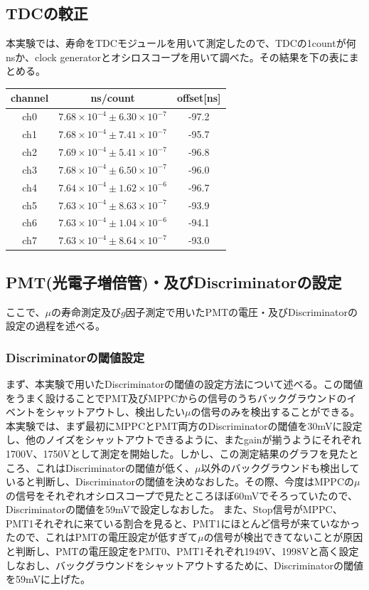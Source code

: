 \subsection{TDCの較正}
本実験では、寿命をTDCモジュールを用いて測定したので、TDCの1countが何nsか、clock generatorとオシロスコープを用いて調べた。その結果を下の表にまとめる。
\begin{table}[H]
  \begin{center}
    \begin{tabular}{c|c|c} \hline
      channel & ns/count & offset[ns] \\ \hline
      ch0 &  $7.68\times 10^{-4}\pm 6.30\times 10^{-7}$ & -97.2 \\
      ch1 &  $7.68\times 10^{-4}\pm 7.41\times 10^{-7}$ & -95.7 \\
      ch2 &  $7.69\times 10^{-4}\pm 5.41\times 10^{-7}$ & -96.8 \\
      ch3 &  $7.68\times 10^{-4}\pm 6.50\times 10^{-7}$ & -96.0 \\
      ch4 &  $7.64\times 10^{-4}\pm 1.62\times 10^{-6}$ & -96.7 \\
      ch5 &  $7.63\times 10^{-4}\pm 8.63\times 10^{-7}$ & -93.9 \\
      ch6 &  $7.63\times 10^{-4}\pm 1.04\times 10^{-6}$ & -94.1 \\
      ch7 &  $7.63\times 10^{-4}\pm 8.64\times 10^{-7}$ & -93.0 \\
    \end{tabular}
  \end{center}
\end{table}
\subsection{PMT(光電子増倍管)・及びDiscriminatorの設定}
ここで、$\mu$の寿命測定及び$g$因子測定で用いたPMTの電圧・及びDiscriminatorの設定の過程を述べる。
\subsubsection{Discriminatorの閾値設定}
まず、本実験で用いたDiscriminatorの閾値の設定方法について述べる。この閾値をうまく設けることでPMT及びMPPCからの信号のうちバックグラウンドのイベントをシャットアウトし、検出したい$\mu$の信号のみを検出することができる。
本実験では、まず最初にMPPCとPMT両方のDiscriminatorの閾値を30mVに設定し、他のノイズをシャットアウトできるように、またgainが揃うようにそれぞれ1700V、1750Vとして測定を開始した。しかし、この測定結果のグラフを見たところ、これはDiscriminatorの閾値が低く、$\mu$以外のバックグラウンドも検出していると判断し、Discriminatorの閾値を決めなおした。その際、今度はMPPCの$\mu$の信号をそれぞれオシロスコープで見たところほぼ60mVでそろっていたので、Discriminatorの閾値を59mVで設定しなおした。
また、Stop信号がMPPC、PMT1それぞれに来ている割合を見ると、PMT1にほとんど信号が来ていなかったので、これはPMTの電圧設定が低すぎて$\mu$の信号が検出できてないことが原因と判断し、PMTの電圧設定をPMT0、PMT1それぞれ1949V、1998Vと高く設定しなおし、バックグラウンドをシャットアウトするために、Discriminatorの閾値を59mVに上げた。
